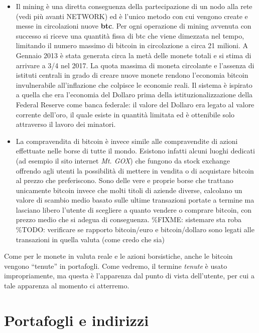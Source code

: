 \begin{itemize}
\item
  Il mining è una diretta conseguenza della partecipazione di un nodo
  alla rete (vedi più avanti NETWORK) ed è l'unico metodo con cui
  vengono create e messe in circolazioni nuove \textbf{btc}. Per ogni
  operazione di mining avvenuta con successo si riceve una quantità
  fissa di btc che viene dimezzata nel tempo, limitando il numero
  massimo di bitcoin in circolazione a circa 21 milioni. A Gennaio 2013
  è stata generata circa la metà delle monete totali e si stima di
  arrivare a 3/4 nel 2017. La quota massima di moneta circolante e
  l'assenza di istituti centrali in grado di creare nuove monete rendono
  l'economia bitcoin invulnerabile all'inflazione che colpisce le
  economie reali. Il sistema è ispirato a quella che era l'economia del
  Dollaro prima della istituzionalizzazione della Federal Reserve come
  banca federale: il valore del Dollaro era legato al valore corrente
  dell'oro, il quale esiste in quantità limitata ed è ottenibile solo
  attraverso il lavoro dei minatori.
\item
  La compravendita di bitcoin è invece simile alle compravendite di
  azioni effettuate nelle borse di tutte il mondo. Esistono infatti
  alcuni luoghi dedicati (ad esempio il sito internet \emph{Mt. GOX})
  che fungono da stock exchange offrendo agli utenti la possibilità di
  mettere in vendita o di acquistare bitcoin al prezzo che preferiscono.
  Sono delle vere e proprie borse che trattano unicamente bitcoin invece
  che molti titoli di aziende diverse, calcolano un valore di scambio
  medio basato sulle ultime transazioni portate a termine ma lasciano
  libero l'utente di scegliere a quanto vendere o comprare bitcoin, con
  prezzo medio che si adegua di conseguenza. \%FIXME: sistemare sta roba
  \%TODO: verificare se rapporto bitcoin/euro e bitcoin/dollaro sono
  legati alle transazioni in quella valuta (come credo che sia)
\end{itemize}

Come per le monete in valuta reale e le azioni borsistiche, anche le
bitcoin vengono ``tenute'' in portafogli. Come vedremo, il termine
\emph{tenute} è usato impropriamente, ma questa è l'apparenza dal punto
di vista dell'utente, per cui a tale apparenza al momento ci atterremo.

\section{Portafogli e indirizzi}\label{portafogli-e-indirizzi}

